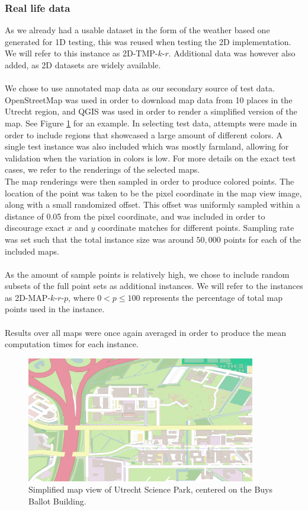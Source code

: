 \documentclass{article}
\begin{document}
\subsubsection*{Real life data}
As we already had a usable dataset in the form of the weather based one generated for 1D testing, this was reused when testing the 2D implementation. We will refer to this instance as 2D-TMP-$k$-$r$. Additional data was however also added, as 2D datasets are widely available. \\\\
We chose to use annotated map data as our secondary source of test data. OpenStreetMap \cite{OpenStreetMap} was used in order to download map data from 10 places in the Utrecht region, and QGIS \cite{QGIS_software} was used in order to render a simplified version of the map. See Figure \ref{fig:uithof} for an example. In selecting test data, attempts were made in order to include regions that showcased a large amount of different colors. A single test instance was also included which was mostly farmland, allowing for validation when the variation in colors is low. For more details on the exact test cases, we refer to the renderings of the selected maps. \\
The map renderings were then sampled in order to produce colored points. The location of the point was taken to be the pixel coordinate in the map view image, along with a small randomized offset. This offset was uniformly sampled within a distance of 0.05 from the pixel coordinate, and was included in order to discourage exact $x$ and $y$ coordinate matches for different points. Sampling rate was set such that the total instance size was around $50,000$ points for each of the included maps. \\\\
As the amount of sample points is relatively high, we chose to include random subsets of the full point sets as additional instances. We will refer to the instances as 2D-MAP-$k$-$r$-$p$, where $0 < p \leq 100$ represents the percentage of total map points used in the instance. \\\\
Results over all maps were once again averaged in order to produce the mean computation times for each instance.

\begin{figure}
    \centering
    \includegraphics[width=10cm]{figs/usp.png}
    \caption{Simplified map view of Utrecht Science Park, centered on the Buys Ballot Building.}
    \label{fig:uithof}
\end{figure}
\end{document}
